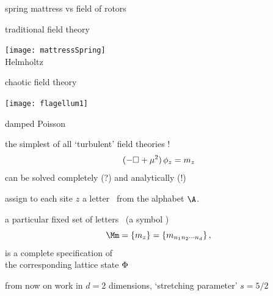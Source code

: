 \begin{frame}{spring mattress vs field of rotors}
\begin{center}
            \begin{minipage}[c]{0.40\textwidth}\begin{center}
traditional field theory
\bigskip

\texttt{[image: mattressSpring]}\\
{\color{blue}Helmholtz}
            \end{center}\end{minipage}
            \hspace{2ex}
            \begin{minipage}[c]{0.46\textwidth}\begin{center}
chaotic field theory\\
\bigskip
\bigskip
\bigskip

\texttt{[image: flagellum1]}\\
\bigskip

damped {\color{blue}Poisson}
            \end{center}\end{minipage}
\end{center}
\end{frame} %

\begin{frame}{the simplest of all `turbulent' field theories ! }
\catlatt
\[
 (-\Box + {\mu}^2)\,\phi_{z} = m_z
\] %
\bigskip
\hfill can be solved completely (?) and analytically (!)

\bigskip
\bigskip

assign to each site $z$ a
letter \ from the alphabet $\A$.

\medskip

a particular fixed set
of letters  \ (a symbol \brick)
\[
\Mm= \{\Ssym{z}\} %
 = \{\Ssym{n_1 n_2 \cdots n_d}\}
\,,
\]
is a complete specification of  \\
the corresponding lattice state $\Phi$
\bigskip

{\color{blue}\footnotesize
from now on work in $d=2$ dimensions, `stretching parameter'
$s=5/2$
}
\end{frame} %

